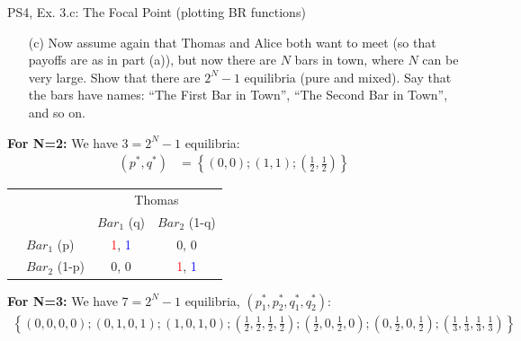 \begin{frame}{PS4, Ex. 3.c: The Focal Point (plotting BR functions)}
    \begin{itemize}
      \item[(c)] Now assume again that Thomas and Alice both want to meet (so that payoffs are as in part (a)), but now there are $N$ bars in town, where $N$ can be very large. Show that there are $2^N-1$ equilibria (pure and mixed). Say that the bars have names: “The First Bar in Town”, “The Second Bar in Town”, and so on.
    \end{itemize}
    \vspace{-6pt}
  \begin{multicols}{2}
    \textbf{For N=2:} We have $3=2^N-1$ equilibria:
    \begin{align*}
      (p^{*},q^{*})&=\left\{(0,0);(1,1);\left(\frac{1}{2},\frac{1}{2}\right)\right\}
    \end{align*}
  \vfill\null \columnbreak
    \vspace{-12pt}
    \begin{table}
      \begin{tabular}{cl|c|c|}
        & \multicolumn{1}{c}{} & \multicolumn{2}{c}{\color{blue}Thomas}\\
        \parbox[t]{1mm}{}
        &  &  &  \\
        & $Bar_1$ (p) & \textcolor{red}{1}, \textcolor{blue}{1} & 0, 0 \\
        & $Bar_2$ (1-p) & 0, 0 & \textcolor{red}{1}, \textcolor{blue}{1} \\
      \end{tabular}
    \end{table}
  \vfill\null
  \end{multicols}
    \vspace{-20pt}
    \textbf{For N=3:} We have $7=2^N-1$ equilibria, $(p_1^{*},p_2^{*},q_1^{*},q_2^{*})$:
    \begin{align*}
      \left\{(0,0,0,0);(0,1,0,1);(1,0,1,0)
      ;\left(\frac{1}{2},\frac{1}{2},\frac{1}{2},\frac{1}{2}\right)
      ;\left(\frac{1}{2},0,\frac{1}{2},0\right)
      ;\left(0,\frac{1}{2},0,\frac{1}{2}\right)
      ;\left(\frac{1}{3},\frac{1}{3},\frac{1}{3},\frac{1}{3}\right)
      \right\}
    \end{align*}
    \vspace{-12pt}
    \begin{table}

\end{table}
\end{frame}
